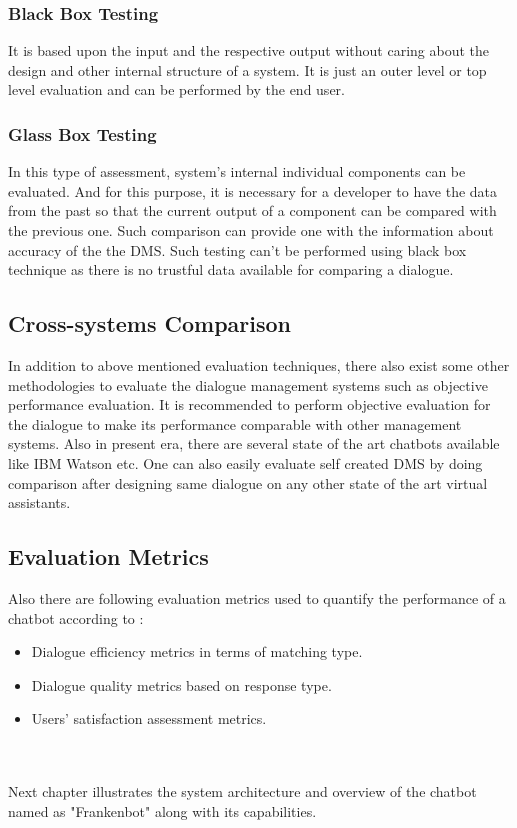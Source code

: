 \subsubsection*{Black Box Testing}
It is based upon the input and the respective output without caring about the design and other internal structure of a system. It is just an outer level or top level evaluation and can be performed by the end user.

\subsubsection*{Glass Box Testing}
In this type of assessment, system's internal individual components can be evaluated. And for this purpose, it is necessary for a developer to have the data from the past so that the current output of a component can be compared with the previous one. Such comparison can provide one with the information about accuracy of the the DMS. Such testing can't be performed using black box technique as there is no trustful data available for comparing a dialogue. \cite{dialoguemanagementsystems}

\subsection{Cross-systems Comparison}
In addition to above mentioned evaluation techniques, there also exist some other methodologies to evaluate the dialogue management systems such as objective performance evaluation. It is recommended to perform objective evaluation for the dialogue to make its performance comparable with other management systems. Also in present era, there are several state of the art chatbots available like IBM Watson etc. One can also easily evaluate self created DMS by doing comparison after designing same dialogue on any other state of the art virtual assistants.

\subsection{Evaluation Metrics}
Also there are following evaluation metrics used to quantify the performance of a chatbot according to \cite{differentMeasurementsMetrics}:
\begin{itemize}
\item Dialogue efficiency metrics in terms of matching type.
\item Dialogue quality metrics based on response type.
\item Users' satisfaction assessment metrics.
\end{itemize}
\\~\\
Next chapter illustrates the system architecture and overview of the chatbot named as "Frankenbot" along with its capabilities.

